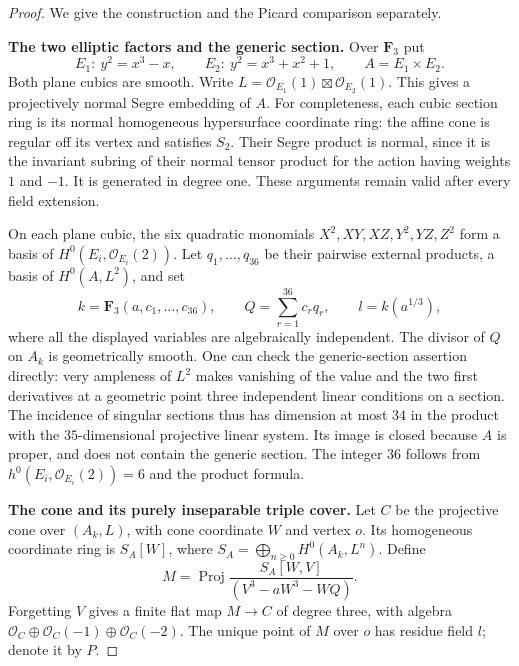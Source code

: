 \begin{proof}
We give the construction and the Picard comparison separately.

\par\smallskip\noindent\textbf{The two elliptic factors and the generic section.}\quad
Over $\mathbf F_3$ put
\[
 E_1:\ y^2=x^3-x,\qquad
 E_2:\ y^2=x^3+x^2+1,
 \qquad A=E_1\times E_2.
\]
Both plane cubics are smooth.  Write
$L=\mathcal O_{E_1}(1)\boxtimes\mathcal O_{E_2}(1)$.
This gives a projectively normal Segre embedding of $A$.
For completeness, each cubic section ring is its normal
homogeneous hypersurface coordinate ring: the affine cone is
regular off its vertex and satisfies $S_2$.  Their Segre product
is normal, since it is the invariant subring of their normal
tensor product for the action having weights $1$ and $-1$.
It is generated in degree one.  These arguments remain valid
after every field extension.

On each plane cubic, the six quadratic monomials
$X^2,XY,XZ,Y^2,YZ,Z^2$ form a basis of
$H^0(E_i,\mathcal O_{E_i}(2))$.  Let
$q_1,\ldots,q_{36}$ be their pairwise external products,
a basis of $H^0(A,L^2)$, and set
\[
 k=\mathbf F_3(a,c_1,\ldots,c_{36}),\qquad
 Q=\sum_{r=1}^{36}c_rq_r,
 \qquad l=k(a^{1/3}),
\]
where all the displayed variables are algebraically independent.
The divisor of $Q$ on $A_k$ is geometrically smooth.  One can
check the generic-section assertion directly: very ampleness of
$L^2$ makes vanishing of the value and the two first derivatives
at a geometric point three independent linear conditions on a
section.  The incidence of singular sections thus has dimension
at most $34$ in the product with the $35$-dimensional projective
linear system.  Its image is closed because $A$ is proper, and
does not contain the generic section.  The integer $36$ follows
from $h^0(E_i,\mathcal O_{E_i}(2))=6$ and the product formula.

\par\smallskip\noindent\textbf{The cone and its purely inseparable triple cover.}\quad
Let $C$ be the projective cone over $(A_k,L)$, with cone coordinate
$W$ and vertex $o$.  Its homogeneous coordinate ring is
$S_A[W]$, where $S_A=\bigoplus_{n\ge0}H^0(A_k,L^n)$.
Define
\[
 M=\operatorname{Proj}
 \frac{S_A[W,V]}{(V^3-aW^3-WQ)}.
 \tag{B.2.9}
\]
Forgetting $V$ gives a finite flat map $M\to C$ of degree three,
with algebra
$\mathcal O_C\oplus\mathcal O_C(-1)\oplus\mathcal O_C(-2)$.
The unique point of $M$ over $o$ has residue field $l$; denote it
by $P$.


\end{proof}
